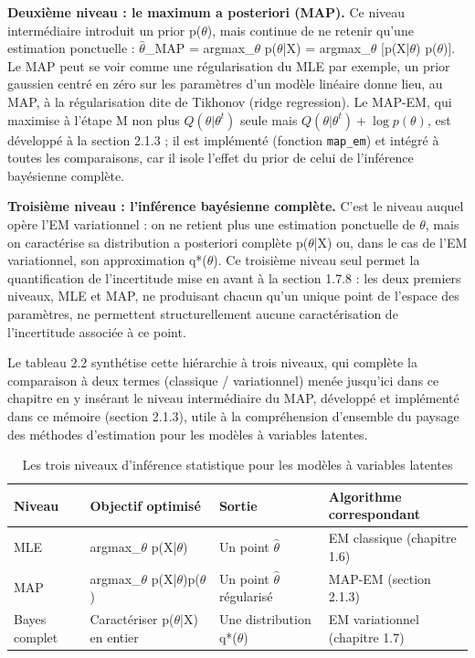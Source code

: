 \textbf{Deuxième niveau : le maximum a posteriori (MAP). }Ce niveau intermédiaire introduit un prior p($\theta $), mais continue de ne retenir qu'une estimation ponctuelle : $\hat{\theta }$\_MAP = argmax\_$\theta $ p($\theta $|X) = argmax\_$\theta $ [p(X|$\theta $) p($\theta $)]. Le MAP peut se voir comme une régularisation du MLE  par exemple, un prior gaussien centré en zéro sur les paramètres d'un modèle linéaire donne lieu, au MAP, à la régularisation dite de Tikhonov (ridge regression). Le MAP-EM, qui maximise à l'étape M non plus $Q(\theta|\theta^t)$ seule mais $Q(\theta|\theta^t) + \log p(\theta)$, est développé à la section 2.1.3 ; il est implémenté (fonction \texttt{map\_em}) et intégré à toutes les comparaisons, car il isole l'effet du prior de celui de l'inférence bayésienne complète.

\textbf{Troisième niveau : l'inférence bayésienne complète. }C'est le niveau auquel opère l'EM variationnel : on ne retient plus une estimation ponctuelle de $\theta $, mais on caractérise sa distribution a posteriori complète p($\theta $|X)  ou, dans le cas de l'EM variationnel, son approximation q*($\theta $). Ce troisième niveau seul permet la quantification de l'incertitude mise en avant à la section 1.7.8 : les deux premiers niveaux, MLE et MAP, ne produisant chacun qu'un unique point de l'espace des paramètres, ne permettent structurellement aucune caractérisation de l'incertitude associée à ce point.

Le tableau 2.2 synthétise cette hiérarchie à trois niveaux, qui complète la comparaison à deux termes (classique / variationnel) menée jusqu'ici dans ce chapitre en y insérant le niveau intermédiaire du MAP, développé et implémenté dans ce mémoire (section 2.1.3), utile à la compréhension d'ensemble du paysage des méthodes d'estimation pour les modèles à variables latentes.

\begin{table}[H]
\centering
\small
\setlength{\tabcolsep}{0.14cm}
\begin{tabular}{|p{3.54cm}|p{3.54cm}|p{3.54cm}|p{3.54cm}|}
\hline
\textbf{Niveau} & \textbf{Objectif optimisé} & \textbf{Sortie} & \textbf{Algorithme correspondant} \\
\hline
MLE & argmax\_$\theta $ p(X|$\theta $) & Un point $\hat{\theta }$ & EM classique (chapitre 1.6) \\
\hline
MAP & argmax\_$\theta $ p(X|$\theta $)p($\theta $) & Un point $\hat{\theta }$ régularisé & MAP-EM (section 2.1.3) \\
\hline
Bayes complet & Caractériser p($\theta $|X) en entier & Une distribution q*($\theta $) & EM variationnel (chapitre 1.7) \\
\hline
\end{tabular}
\caption{Les trois niveaux d'inférence statistique pour les modèles à variables latentes}
\label{tab:2_2}
\end{table}
